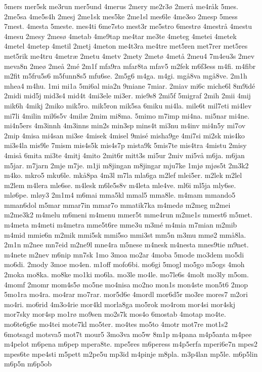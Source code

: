{5mers
mer5sk
me3run
mer5und
4merus
2mery
me2r3^^f8
2mer^^e5
me4r^^e5k
5mes.
2me5sa
4me5s4h
2mesj
2me1sk
mes5ke
2me1sl
mes6le
4me3so
2mesp
5mess
7mest.
4mesta
5meste.
mes4ti
6me7sto
mest3r
me5stro
6mestr^^f8
4mestr^^e5
4mestu
4mesu
2mesy
2mes^^f8
4metab
4me9tap
me4tar
me3te
4meteg
4metei
4metek
4metel
4metep
4metil
2metj
4meton
me4t3ra
me4tre
met5ren
met7rer
met5res
met5rik
me4tru
4metr^^e6
2metu
4metv
2mety
2met^^f8
4met^^e5
2meu4
7m4eu3s
2mev
meva8n
2me^^f8
2me^^e5
2m^^e9
2m1f
mfa9ra
mfar8ta
mfav5
m2fek
m6f3ess
m4fi.
m4fibr
m2fit
m5fru5s6
m5funn8s5
mfu6se.
2m5g6
m4ga.
m4gi.
mg^^e58va
mg^^e58ve.
2m1h
mhea4
m4hu.
1mi
mi1a
5mi6al
mia2n
9miane
7miar.
2miav
mi6c
miche6l
8m9id^^e9
2midi
mid5j
mid3s4
mid4t
4mi3ele
mi3er.
mie9s8
2mi5f
5migraf
2mih
2mii
4mij
mik6h
4mikj
2miko
mik5ro.
mik5ron
mik5sa
6miku
mi4la.
mile6t
mil7eti
mi4lev
mi7li
4milin
mil6s5v
4mil^^e6
2mim
mi8ma.
5mimo
m7imp
mi4na.
mi5nar
mi4ne.
mi4n5ers
4m3innh
4m3inns
min2s
min3sp
mins4t
mi3nu
m4inv
mi4n5y
mi7ov
2mip
4misa
mi4san
mi3se
4misek
4misel
9mis^^e9
misha9ge
4mi7si
mi2sk
mis4ko
mi3s4la
mis9le
7mism
mis4s5k
mis4s7p
mista9k
5mis7te
mis4tra
4mistu
2misy
4mis^^e5
6mita
mi3te
4mitj
4mito
2mit6r
mitt3s
mi5ur
2miv
mi5v^^e5
m6ja.
m6jan
m5jar.
m7jarn
2mje
m7je.
m1ji
m8jingan
m8jingar
mju7ke
1mj^^f8
mj^^f8s5t
2m3k2
m4ko.
mkro5
mku6le.
mk^^e58pa
4m3l
m7la
mla6ga
m2lef
mlei5er.
m2lek
m2lel
m2lem
m4lera
mle6se.
m4lesk
m6le5s8v
m4leta
mle4ve.
ml6i
ml5ja
mly6se.
ml^^f86pe.
ml^^f8y3
2m1m4
m6mai
mma5kl
mmal5
mma8le.
m4mam
mmando5
mman6dol
m5mar
mmar7in
mmar7o
mmatik7ka
m4med^^f8
m2meg
m2mei
m2me3k2
m4melu
m6meni
m4menu
mmer5t
mme4run
m2me1s
mmest6
m5met.
m4meta
m4meti
m4metra
mme5t6re
mme3u
m3m^^e9
m4mia
m7mian
m2mib
m4mid
mmie6n
m2mik
mmi5sk
mmi5so
mmi3st
mm5n
m3mu
mm^^f82
mm^^e58la.
2m1n
m2nee
mn7eid
m2ne9l
mne4ra
m5nese
m4nesk
m4nesta
mnes9tie
m9net.
m4nete
m2nev
m6nip
mn7sk
1mo
3moa
mo2ar
4moba
5mode
mo3dem
mo5di
mo6di.
2mody
3moe
mo4en.
m1off
mofo6bi.
mo6gi
5mogl
mo5go
m5ogs
4moh
2moka
mo8ka.
mo8ke
mo1ki
mo6la.
mo3le
mo4le.
mo7le6s
4molt
mo3ly
m5om.
4momf
2momr
mom4s5^^f8
mo5ne
mo4nisa
mo2no
mon1s
mon4ste
mon5t6
2mop
5mo1ra
mo4ra.
mo4rar
mo7rar.
mor5d6e
4mordl
mor6d5r
mo3re
mores7
m2ori
mo4ri.
mo6rid
4m3o4rie
mor4kl
morla8ga
mo5rok
mo4rom
mor4si
mor4skj
mor7sky
mor4sp
mo1r^^f8
mo9sen
mo2s7k
mos4o
6mostab
4motap
mo4te.
mo6te6g6e
mo4tei
mote7kl
mo5ter.
mo4tes
mo5to
4motr
mot7re
mot1s2
6motsagd
motsva5
mot7t
mour5
3mo3va
mo5w
8m1p
m4pana
m4p5anta
m4pee
m4pelot
m6pena
m6pep
mpera8te.
mpe5res
m6peress
m4p5erfa
mperi6e7n
mpes2
mpes6te
mpe4sti
m5pett
m2pe5u
mp3id
m4pinje
m8pla.
m3p4lan
mp5le.
m6p5lin
m6p5n
m6p5ob
}

